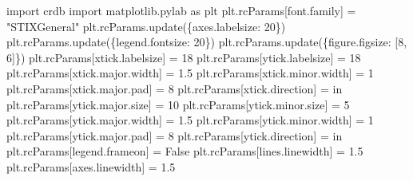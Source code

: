 \documentclass[
  letterpaper,
  DIV=11,
  numbers=noendperiod]{scrreprt}
\newenvironment{Shaded}{\begin{snugshade}}{\end{snugshade}}
\newcommand{\DecValTok}[1]{\textcolor[rgb]{0.68,0.00,0.00}{#1}}
\newcommand{\FloatTok}[1]{\textcolor[rgb]{0.68,0.00,0.00}{#1}}
\newcommand{\ImportTok}[1]{\textcolor[rgb]{0.00,0.46,0.62}{#1}}
\newcommand{\NormalTok}[1]{\textcolor[rgb]{0.00,0.23,0.31}{#1}}
\newcommand{\OperatorTok}[1]{\textcolor[rgb]{0.37,0.37,0.37}{#1}}
\newcommand{\StringTok}[1]{\textcolor[rgb]{0.13,0.47,0.30}{#1}}
\newcommand{\VariableTok}[1]{\textcolor[rgb]{0.07,0.07,0.07}{#1}}
\begin{document}
\begin{Shaded}
\begin{Highlighting}[]
\ImportTok{import}\NormalTok{ crdb}
\ImportTok{import}\NormalTok{ matplotlib.pylab }\ImportTok{as}\NormalTok{ plt}
\NormalTok{plt.rcParams[}\StringTok{\textquotesingle{}font.family\textquotesingle{}}\NormalTok{] }\OperatorTok{=} \StringTok{"STIXGeneral"}
\NormalTok{plt.rcParams.update(\{}\StringTok{\textquotesingle{}axes.labelsize\textquotesingle{}}\NormalTok{: }\DecValTok{20}\NormalTok{\})}
\NormalTok{plt.rcParams.update(\{}\StringTok{\textquotesingle{}legend.fontsize\textquotesingle{}}\NormalTok{: }\DecValTok{20}\NormalTok{\})}
\NormalTok{plt.rcParams.update(\{}\StringTok{\textquotesingle{}figure.figsize\textquotesingle{}}\NormalTok{: [}\DecValTok{8}\NormalTok{, }\DecValTok{6}\NormalTok{]\})}
\NormalTok{plt.rcParams[}\StringTok{\textquotesingle{}xtick.labelsize\textquotesingle{}}\NormalTok{] }\OperatorTok{=} \DecValTok{18}
\NormalTok{plt.rcParams[}\StringTok{\textquotesingle{}ytick.labelsize\textquotesingle{}}\NormalTok{] }\OperatorTok{=} \DecValTok{18}
\NormalTok{plt.rcParams[}\StringTok{\textquotesingle{}xtick.major.width\textquotesingle{}}\NormalTok{] }\OperatorTok{=} \FloatTok{1.5}
\NormalTok{plt.rcParams[}\StringTok{\textquotesingle{}xtick.minor.width\textquotesingle{}}\NormalTok{] }\OperatorTok{=} \DecValTok{1}
\NormalTok{plt.rcParams[}\StringTok{\textquotesingle{}xtick.major.pad\textquotesingle{}}\NormalTok{] }\OperatorTok{=} \DecValTok{8}
\NormalTok{plt.rcParams[}\StringTok{\textquotesingle{}xtick.direction\textquotesingle{}}\NormalTok{] }\OperatorTok{=} \StringTok{\textquotesingle{}in\textquotesingle{}}
\NormalTok{plt.rcParams[}\StringTok{\textquotesingle{}ytick.major.size\textquotesingle{}}\NormalTok{] }\OperatorTok{=} \DecValTok{10}
\NormalTok{plt.rcParams[}\StringTok{\textquotesingle{}ytick.minor.size\textquotesingle{}}\NormalTok{] }\OperatorTok{=} \DecValTok{5}
\NormalTok{plt.rcParams[}\StringTok{\textquotesingle{}ytick.major.width\textquotesingle{}}\NormalTok{] }\OperatorTok{=} \FloatTok{1.5}
\NormalTok{plt.rcParams[}\StringTok{\textquotesingle{}ytick.minor.width\textquotesingle{}}\NormalTok{] }\OperatorTok{=} \DecValTok{1}
\NormalTok{plt.rcParams[}\StringTok{\textquotesingle{}ytick.major.pad\textquotesingle{}}\NormalTok{] }\OperatorTok{=} \DecValTok{8}
\NormalTok{plt.rcParams[}\StringTok{\textquotesingle{}ytick.direction\textquotesingle{}}\NormalTok{] }\OperatorTok{=} \StringTok{\textquotesingle{}in\textquotesingle{}}
\NormalTok{plt.rcParams[}\StringTok{\textquotesingle{}legend.frameon\textquotesingle{}}\NormalTok{] }\OperatorTok{=} \VariableTok{False}
\NormalTok{plt.rcParams[}\StringTok{\textquotesingle{}lines.linewidth\textquotesingle{}}\NormalTok{] }\OperatorTok{=} \FloatTok{1.5}
\NormalTok{plt.rcParams[}\StringTok{\textquotesingle{}axes.linewidth\textquotesingle{}}\NormalTok{] }\OperatorTok{=} \FloatTok{1.5}




\end{Highlighting}
\end{Shaded}
\end{document}
